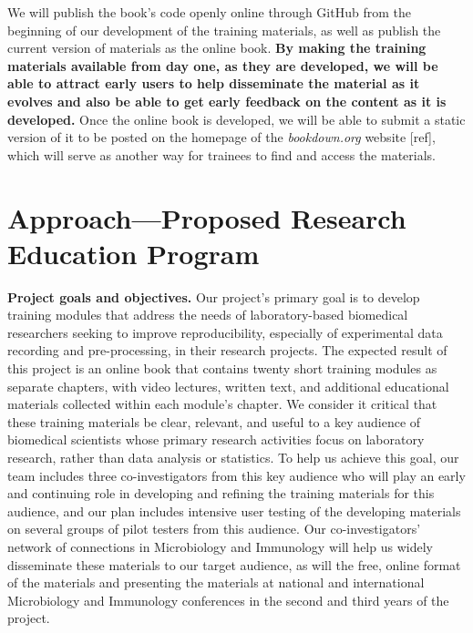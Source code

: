 \documentclass[pdftex,english,11pt,parskip=half]{scrartcl}
\begin{document}
We will publish the book's code openly online through GitHub from the beginning
of our development of the training materials, as well as publish the current
version of materials as the online book. \textbf{By making the training
materials available from day one, as they are developed, we will be able to
attract early users to help disseminate the material as it evolves and also be
able to get early feedback on the content as it is developed.} Once the online
book is developed, we will be able to submit a static version of it to be posted
on the homepage of the \textit{bookdown.org} website [ref], which will serve as
another way for trainees to find and access the materials.

\section{Approach---Proposed Research Education Program}

\textbf{Project goals and objectives.} Our project's primary goal is to develop
training modules that address the needs of laboratory-based biomedical
researchers seeking to improve reproducibility, especially of experimental data
recording and pre-processing, in their research projects. The expected result of
this project is an online book that contains twenty short training modules as separate
chapters, with video lectures, written text, and additional educational
materials collected within each module's chapter. We consider it critical that
these training materials be clear, relevant, and useful to a key audience of
biomedical scientists whose primary research activities focus on laboratory
research, rather than data analysis or statistics. To help us achieve this goal,
our team includes three co-investigators from this key audience who will play an
early and continuing role in developing and refining the training materials for
this audience, and our plan includes intensive user testing of the developing
materials on several groups of pilot testers from this audience. Our
co-investigators' network of connections in Microbiology and Immunology will
help us widely disseminate these materials to our target audience, as will the
free, online format of the materials and presenting the materials at national
and international Microbiology and Immunology conferences in the second and
third years of the project.
\end{document}
